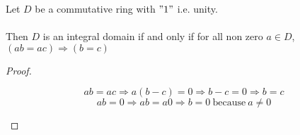 \documentclass[class=scrartcl, crop=false]{standalone}
\begin{document}
\begin{proposition}
  Let $D$ be a commutative ring with $"1"$ i.e. unity.
  \\\\
  Then $D$ is an integral domain if and only if for all non zero  $a \in D$, $(ab = ac) \Rightarrow (b = c)$
  \begin{proof}
    \begin{itemize}
      \ii[]
      \ii[$(\Rightarrow)$ ]
      \[
        ab = ac \Rightarrow a(b - c) = 0 \Rightarrow b - c = 0 \Rightarrow b = c
      \]
      \ii[$(\Leftarrow)$ ]
      \[ab = 0 \Rightarrow ab = a 0 \Rightarrow b = 0 \ \text{because} \ a \neq 0\]
    \end{itemize} 
  \end{proof} 
\end{proposition} 
\end{document}
